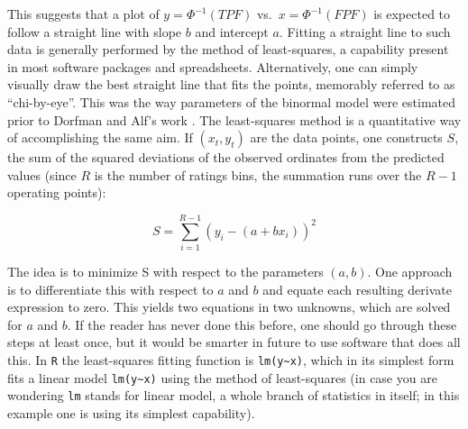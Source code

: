 \documentclass[
]{book}
\begin{document}
This suggests that a plot of \(y = \Phi^{-1}\left ( TPF \right )\) vs.~\(x=\Phi^{-1}\left ( FPF \right )\) is expected to follow a straight line with slope \(b\) and intercept \(a\). Fitting a straight line to such data is generally performed by the method of least-squares, a capability present in most software packages and spreadsheets. Alternatively, one can simply visually draw the best straight line that fits the points, memorably referred to \citep{RN300} as ``chi-by-eye''. This was the way parameters of the binormal model were estimated prior to Dorfman and Alf's work \citep{RN1081}. The least-squares method is a quantitative way of accomplishing the same aim. If \(\left ( x_t,y_t \right )\) are the data points, one constructs \(S\), the sum of the squared deviations of the observed ordinates from the predicted values (since \(R\) is the number of ratings bins, the summation runs over the \(R-1\) operating points):

\begin{equation*} 
S  = \sum_{i=1}^{R-1}\left ( y_i - \left ( a + bx_i \right ) \right )^2
\end{equation*}

The idea is to minimize S with respect to the parameters \((a,b)\). One approach is to differentiate this with respect to \(a\) and \(b\) and equate each resulting derivate expression to zero. This yields two equations in two unknowns, which are solved for \(a\) and \(b\). If the reader has never done this before, one should go through these steps at least once, but it would be smarter in future to use software that does all this. In \texttt{R} the least-squares fitting function is \texttt{lm(y\textasciitilde{}x)}, which in its simplest form fits a linear model \texttt{lm(y\textasciitilde{}x)} using the method of least-squares (in case you are wondering \texttt{lm} stands for linear model, a whole branch of statistics in itself; in this example one is using its simplest capability).
\end{document}
